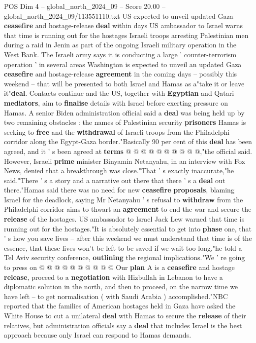 \begin{textsample}{POS Dim 4 – global\_north\_2024\_09 – Score 20.00 – global\_north\_2024\_09/113551110.txt}  \label{ex:f4_pos_316}
US expected to unveil updated Gaza \textbf{ceasefire} and hostage-release \textbf{deal} within days US ambassador to Israel warns that time is running out for the hostages Israeli troops arresting Palestinian men during a raid in Jenin as part of the ongoing Israeli military operation in the West Bank.
The Israeli army says it is conducting a large ' counter-terrorism operation ' in several areas Washington is expected to unveil an updated Gaza \textbf{ceasefire} and hostage-release \textbf{agreement} in the coming days -- possibly this weekend -- that will be presented to both Israel and Hamas as a"take it or leave it"\textbf{deal}.
Contacts continue and the US, together with \textbf{Egyptian} and Qatari \textbf{mediators}, aim to \textbf{finalise} details with Israel before exerting pressure on Hamas.
A senior Biden administration official said a \textbf{deal} was being held up by two remaining obstacles : the names of Palestinian security \textbf{prisoners} Hamas is seeking to \textbf{free} and the \textbf{withdrawal} of Israeli troops from the Philadelphi corridor along the Egypt-Gaza border."Basically 90 per cent of this \textbf{deal} has been agreed, and it ' s been agreed at \textbf{terms} @ @ @ @ @ @ @ @ @ @,"the official said.
However, Israeli \textbf{prime} minister Binyamin Netanyahu, in an interview with Fox News, denied that a breakthrough was close."That ' s exactly inaccurate,"he said."There ' s a story and a narrative out there that there ' s a \textbf{deal} out there."Hamas said there was no need for new \textbf{ceasefire} \textbf{proposals}, blaming Israel for the deadlock, saying Mr Netanyahu ' s refusal to \textbf{withdraw} from the Philadelphi corridor aims to thwart an \textbf{agreement} to end the war and secure the \textbf{release} of the hostages.
US ambassador to Israel Jack Lew warned that time is running out for the hostages."It is absolutely essential to get into \textbf{phase} one, that ' s how you save lives -- after this weekend we must understand that time is of the essence, that these lives won't be left to be saved if we wait too long,"he told a Tel Aviv security conference, \textbf{outlining} the regional implications."We ' re going to press on @ @ @ @ @ @ @ @ @ @ Our \textbf{plan} A is a \textbf{ceasefire} and hostage \textbf{release}, proceed to a \textbf{negotiation} with Hizbullah in Lebanon to have a diplomatic solution in the north, and then to proceed, on the narrow time we have left -- to get normalisation ( with Saudi Arabia ) accomplished."NBC reported that the families of American hostages held in Gaza have asked the White House to cut a unilateral \textbf{deal} with Hamas to secure the \textbf{release} of their relatives, but administration officials say a \textbf{deal} that includes Israel is the best approach because only Israel can respond to Hamas demands.

\end{textsample}
